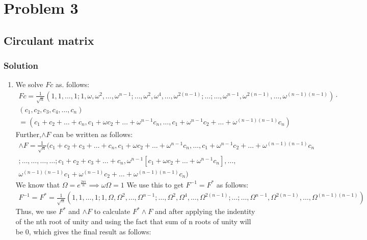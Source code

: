 \documentclass{article}
\begin{document}
\section*{Problem 3}
\subsection*{Circulant matrix}
\subsubsection*{Solution}
\begin{enumerate}[label=\alph*]
    \item We solve $Fc$ as. follows:
    \begin{align*}
        Fc = \frac{1}{\sqrt{n}}(1,1,\ldots,1;1,\omega,\omega^2,\ldots,\omega^{n-1};\ldots,\omega^{2},\omega^{4},\ldots,\omega^{2(n-1)};\ldots;\ldots,\omega^{n-1},\omega^{2(n-1)},\ldots,\omega^{(n-1)(n-1)})\cdot\\
        (c_1,c_2,c_3,c_4,\ldots,c_n)\\
        = (c_1+c_2+\ldots+c_n,c_1+\omega c_2+\ldots+\omega^{n-1} c_n,\ldots,c_1+\omega^{n-1} c_2+\ldots+\omega^{(n-1)(n-1)} c_n)
    \end{align*}
    Further,$\wedge F$ can be written as follows:
    \begin{align*}
        \wedge F = \frac{1}{\sqrt{n}}(c_1+c_2+c_3+\ldots+c_n,c_1+\omega c_2+\ldots+\omega^{n-1} c_n,\ldots,c_1+\omega^{n-1} c_2+\ldots+\omega^{(n-1)(n-1)} c_n\\
        ;\ldots,\ldots,\ldots,\ldots;c_1+c_2+c_3+\ldots+c_n,\omega^{n-1}[c_1+\omega c_2+\ldots+\omega^{n-1} c_n],\ldots,\\\omega^{(n-1)(n-1)}c_1+\omega^{(n-1)}c_2+\ldots+\omega^{(n-1)(n-1)}c_n)
    \end{align*}
    We know that $\Omega=e^{\frac{2\pi i}{n}} \implies \omega\Omega =1$
    We use this to get $F^{-1} = F^*$ as follows:
    \begin{align*}
        F^{-1} = F^* = \frac{1}{\sqrt{n}}(1,1,\ldots,1;1,\Omega,\Omega^2,\ldots,\Omega^{n-1};\ldots,\Omega^{2},\Omega^{4},\ldots,\Omega^{2(n-1)};\ldots;\ldots,\Omega^{n-1},\Omega^{2(n-1)},\ldots,\Omega^{(n-1)(n-1)})
    \end{align*}
    Thus, we use $F^*$ and $\wedge F$ to calculate $F^*\wedge F$ and after applying the indentity of the nth root of unity and using the fact that sum of n roots of unity will be 0, which gives the final result as follows:
    \begin{align*}

\end{align*}
\end{enumerate}
\end{document}
